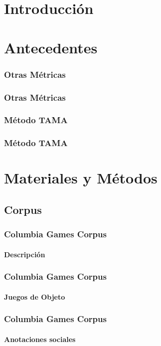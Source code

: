 \documentclass{beamer}
\title{\tituloTesis}
\author{Juan Manuel Pérez}
\begin{document}
\beamertemplatenavigationsymbolsempty


\frame{\titlepage}





\section{Introducción}



\section{Antecedentes}



\begin{frame}
  \frametitle{Otras Métricas}
\end{frame}

\begin{frame}
  \frametitle{Otras Métricas}
  \subtitle{Problemas}
\end{frame}



\begin{frame}
  \frametitle{Método TAMA}
\end{frame}


\begin{frame}
  \frametitle{Método TAMA}
  \subtitle{Ventajas}
\end{frame}


\section{Materiales y Métodos}

\subsection{Corpus}
\begin{frame}
  \frametitle{Columbia Games Corpus}
  \framesubtitle{Descripción}

\end{frame}


\begin{frame}
  \frametitle{Columbia Games Corpus}
  \framesubtitle{Juegos de Objeto}

\end{frame}


\begin{frame}
  \frametitle{Columbia Games Corpus}
  \framesubtitle{Anotaciones sociales}

\end{frame}
\end{document}
